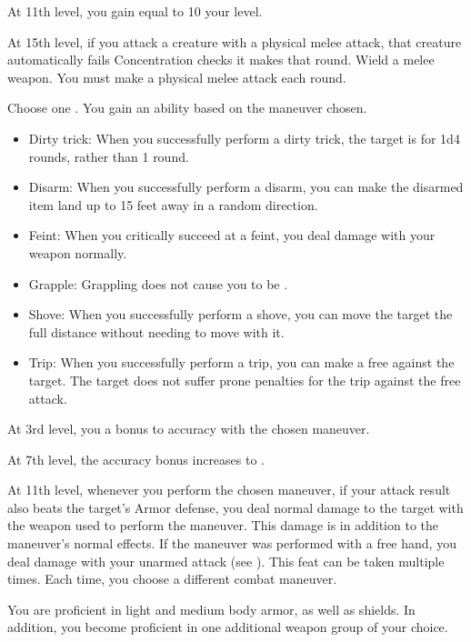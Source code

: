     At 11th level, you gain  equal to 10 \add your level.

    At 15th level, if you attack a creature with a physical melee attack, that creature automatically fails Concentration checks it makes that round.
    \stylereq Wield a melee weapon. You must make a physical melee attack each round.

    Choose one .
    \featben You gain an ability based on the maneuver chosen.
    \begin{itemize}
        \item Dirty trick: When you successfully perform a dirty trick, the target is \impaired for 1d4 rounds, rather than 1 round.
        \item Disarm: When you successfully perform a disarm, you can make the disarmed item land up to 15 feet away in a random direction.
        \item Feint: When you critically succeed at a feint, you deal damage with your weapon normally.
        \item Grapple: Grappling does not cause you to be .
        \item Shove: When you successfully perform a shove, you can move the target the full distance without needing to move with it.
        \item Trip: When you successfully perform a trip, you can make a free  against the target. The target does not suffer prone penalties for the trip against the free attack.
    \end{itemize}

    At 3rd level, you a  bonus to accuracy with the chosen maneuver.

    At 7th level, the accuracy bonus increases to .

    At 11th level, whenever you perform the chosen maneuver, if your attack result also beats the target's Armor defense, you deal normal damage to the target with the weapon used to perform the maneuver.
    This damage is in addition to the maneuver's normal effects.
    If the maneuver was performed with a free hand, you deal damage with your unarmed attack (see ).
     This feat can be taken multiple times.
    Each time, you choose a different combat maneuver.

    \featben You are proficient in light and medium body armor, as well as shields.
    In addition, you become proficient in one additional weapon group of your choice.

